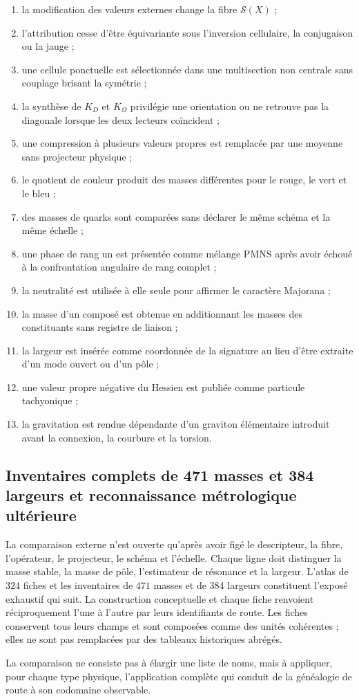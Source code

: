 \begin{enumerate}
\item la modification des valeurs externes change la fibre \(\mathscr S(X)\) ;
\item l'attribution cesse d'être équivariante sous l'inversion cellulaire,
      la conjugaison ou la jauge ;
\item une cellule ponctuelle est sélectionnée dans une multisection non centrale sans
      couplage brisant la symétrie ;
\item la synthèse de \(K_D\) et \(K_\Omega\) privilégie une orientation ou ne
      retrouve pas la diagonale lorsque les deux lecteurs coïncident ;
\item une compression à plusieurs valeurs propres est remplacée par une moyenne sans
      projecteur physique ;
\item le quotient de couleur produit des masses différentes pour le rouge, le vert et le bleu ;
\item des masses de quarks sont comparées sans déclarer le même schéma et la même échelle ;
\item une phase de rang un est présentée comme mélange PMNS après avoir échoué à la
      confrontation angulaire de rang complet ;
\item la neutralité est utilisée à elle seule pour affirmer le caractère Majorana ;
\item la masse d'un composé est obtenue en additionnant les masses des constituants sans
      registre de liaison ;
\item la largeur est insérée comme coordonnée de la signature au lieu d'être extraite
      d'un mode ouvert ou d'un pôle ;
\item une valeur propre négative du Hessien est publiée comme particule tachyonique ;
\item la gravitation est rendue dépendante d'un graviton élémentaire introduit
      avant la connexion, la courbure et la torsion.
\end{enumerate}

\subsection{Inventaires complets de 471 masses et 384 largeurs et reconnaissance métrologique ultérieure}

La comparaison externe n'est ouverte qu'après avoir figé le descripteur,
la fibre, l'opérateur, le projecteur, le schéma et l'échelle. Chaque ligne doit distinguer la masse
stable, la masse de pôle, l'estimateur de résonance et la largeur. L'atlas de \(324\)
fiches et les inventaires de \(471\) masses et de \(384\) largeurs constituent
l'exposé exhaustif qui suit. La construction conceptuelle et chaque fiche
renvoient réciproquement l'une à l'autre par leurs identifiants de route. Les fiches
conservent tous leurs champs et sont composées comme des unités cohérentes ; elles ne sont pas
remplacées par des tableaux historiques abrégés.

La comparaison ne consiste pas à élargir une liste de noms, mais à appliquer,
pour chaque type physique, l'application complète qui conduit de la généalogie de route
à son codomaine observable.

